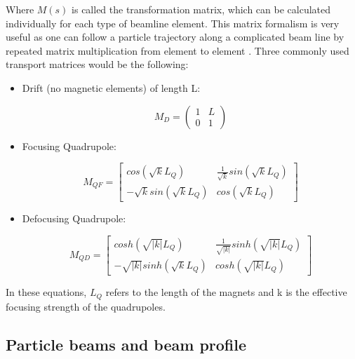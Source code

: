 Where $M(s)$ is called the transformation matrix, which can be calculated individually for each type of beamline element. This matrix formalism is very useful as one can follow a particle trajectory along a complicated beam line by repeated matrix multiplication from element to element \parencite*[][]{ref:MatrixTransport}. Three commonly used transport matrices would be the following: 

\begin{itemize}
    \item Drift (no magnetic elements) of length L:
    
    \begin{equation}
        M_D
        =
        \begin{pmatrix}
             1 & L \\ 0 & 1
        \end{pmatrix}
    \end{equation}

    \item Focusing Quadrupole: 
    
    \begin{equation}
        M_{QF} =
        \begin{bmatrix}
             cos\left(\sqrt{k}L_Q\right) & \frac{1}{\sqrt{k}}sin\left(\sqrt{k}L_Q\right) \\
             -\sqrt{k}sin\left(\sqrt{k}L_Q\right) & cos\left(\sqrt{k}L_Q\right)
        \end{bmatrix}
    \end{equation}

    \item Defocusing Quadrupole:
    
    \begin{equation}
        M_{QD} =
        \begin{bmatrix}
             cosh\left(\sqrt{\left|k\right|}L_Q\right) & \frac{1}{\sqrt{\left|k\right|}}sinh\left(\sqrt{\left|k\right|}L_Q\right) \\
             -\sqrt{\left|k\right|}sinh\left(\sqrt{k}L_Q\right) & cosh\left(\sqrt{\left|k\right|}L_Q\right)
        \end{bmatrix}
    \end{equation}

\end{itemize}

In these equations, $L_Q$ refers to the length of the magnets and k is the effective focusing strength of the quadrupoles. 


\subsection{Particle beams and beam profile}
\label{subsec:TransBeamProf}

